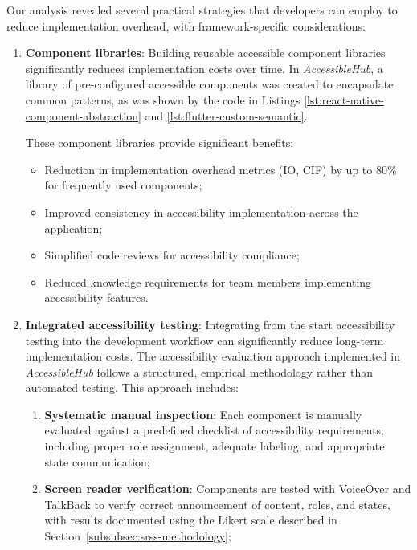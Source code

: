 Our analysis revealed several practical strategies that developers can employ to reduce implementation overhead, with framework-specific considerations:

\begin{enumerate}
    \item \textbf{Component libraries}: Building reusable accessible component libraries significantly reduces implementation costs over time. In \textit{AccessibleHub}, a library of pre-configured accessible components was created to encapsulate  common patterns, as was shown by the code in Listings \ref{lst:react-native-component-abstraction} and \ref{lst:flutter-custom-semantic}.

    These component libraries provide significant benefits:
    \begin{itemize}
        \item Reduction in implementation overhead metrics (IO, CIF) by up to 80\% for frequently used components;
        \item Improved consistency in accessibility implementation across the application;
        \item Simplified code reviews for accessibility compliance;
        \item Reduced knowledge requirements for team members implementing accessibility features.
    \end{itemize}
    
    \item \textbf{Integrated accessibility testing}: Integrating from the start accessibility testing into the development workflow can significantly reduce long-term implementation costs. The accessibility evaluation approach implemented in \textit{AccessibleHub} follows a structured, empirical methodology rather than automated testing. This approach includes:

    \begin{enumerate}
        \item \textbf{Systematic manual inspection}: Each component is manually evaluated against a predefined checklist of accessibility requirements, including proper role assignment, adequate labeling, and appropriate state communication;

        \item \textbf{Screen reader verification}: Components are tested with VoiceOver and TalkBack to verify correct announcement of content, roles, and states, with results documented using the Likert scale described in Section~\ref{subsubsec:srss-methodology};


\end{enumerate}
\end{enumerate}
